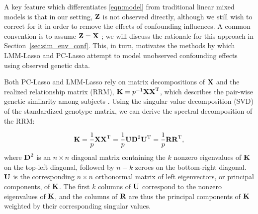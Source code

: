 A key feature which differentiates \eqref{eqn:model} from traditional linear mixed models is that in our setting, $\textbf{Z}$ is not observed directly, although we still wish to correct for it in order to remove the effects of confounding influences. A common convention is to assume $\textbf{Z} = \textbf{X}$ \citep{wang2018multiplex, lippert2011fast, yang2014advantages}; we will discuss the rationale for this approach in Section~\ref{sec:sim_env_conf}.  This, in turn, motivates the methods by which LMM-Lasso and PC-Lasso attempt to model unobserved confounding effects using observed genetic data.

Both PC-Lasso and LMM-Lasso rely on matrix decompositions of $\textbf{X}$ and the realized relationship matrix (RRM), $\textbf{K} = p^{-1} \textbf{X} \textbf{X}^{\text{T}}$, which describes the pair-wise genetic similarity among subjects \citep{hayes2009increased}. Using the singular value decomposition (SVD) of the standardized genotype matrix, we can derive the spectral decomposition of the RRM: 

\begin{equation}
    \label{eqn:k}
    \textbf{K} = \frac{1}{p} \textbf{X} \textbf{X}^{\text{T}} = \frac{1}{p} \textbf{U} \textbf{D}^2 \textbf{U}^{\text{T}} = \frac{1}{p} \textbf{R} \textbf{R}^{\text{T}},
\end{equation}
where $\textbf{D}^2$ is an $n \times n$ diagonal matrix containing the $k$ nonzero eigenvalues of $\textbf{K}$ on the top-left diagonal, followed by $n - k$ zeroes on the bottom-right diagonal. $\textbf{U}$ is the corresponding $n \times n$ orthonormal matrix of left eigenvectors, or principal components, of $\textbf{K}$. The first $k$ columns of $\textbf{U}$ correspond to the nonzero eigenvalues of $\textbf{K}$, and the columns of $\textbf{R}$ are thus the principal components of $\textbf{K}$ weighted by their corresponding singular values. 

